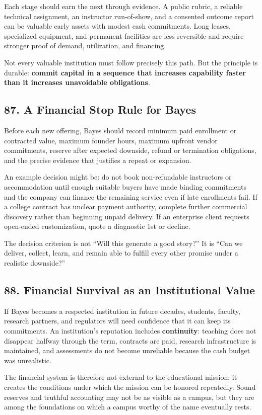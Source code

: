 Each stage should earn the next through evidence. A public rubric, a reliable technical assignment, an instructor run-of-show, and a consented outcome report can be valuable early assets with modest cash commitments. Long leases, specialized equipment, and permanent facilities are less reversible and require stronger proof of demand, utilization, and financing.

Not every valuable institution must follow precisely this path. But the principle is durable: \textbf{commit capital in a sequence that increases capability faster than it increases unavoidable obligations}.

\subsection*{87. A Financial Stop Rule for Bayes}

Before each new offering, Bayes should record minimum paid enrollment or contracted value, maximum founder hours, maximum upfront vendor commitments, reserve after expected downside, refund or termination obligations, and the precise evidence that justifies a repeat or expansion.

An example decision might be: do not book non-refundable instructors or accommodation until enough suitable buyers have made binding commitments and the company can finance the remaining service even if late enrollments fail. If a college contract has unclear payment authority, complete further commercial discovery rather than beginning unpaid delivery. If an enterprise client requests open-ended customization, quote a diagnostic 1st or decline.

The decision criterion is not ``Will this generate a good story?'' It is ``Can we deliver, collect, learn, and remain able to fulfill every other promise under a realistic downside?''

\subsection*{88. Financial Survival as an Institutional Value}

If Bayes becomes a respected institution in future decades, students, faculty, research partners, and regulators will need confidence that it can keep its commitments. An institution's reputation includes \textbf{continuity}: teaching does not disappear halfway through the term, contracts are paid, research infrastructure is maintained, and assessments do not become unreliable because the cash budget was unrealistic.

The financial system is therefore not external to the educational mission: it creates the conditions under which the mission can be honored repeatedly. Sound reserves and truthful accounting may not be as visible as a campus, but they are among the foundations on which a campus worthy of the name eventually rests.
